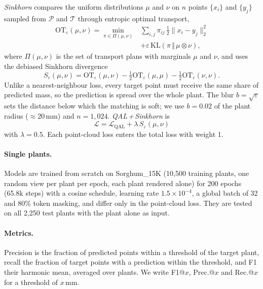 \documentclass[10pt,twocolumn,letterpaper]{article}
\begin{document}
\emph{Sinkhorn} compares the uniform distributions $\mu$ and $\nu$ on $n$ points $\{x_i\}$ and $\{y_j\}$ sampled from
$\mathcal{P}$ and $\mathcal{T}$ through entropic optimal transport,
\begin{equation}
  \begin{aligned}
    \mathrm{OT}_\varepsilon(\mu,\nu) = \min_{\pi\in\Pi(\mu,\nu)} &\sum_{i,j}\pi_{ij}\,\tfrac12\lVert x_i-y_j\rVert_2^2\\
      &+ \varepsilon\,\mathrm{KL}(\pi\,\Vert\,\mu\otimes\nu),
  \end{aligned}
  \label{eq:ot}
\end{equation}
where $\Pi(\mu,\nu)$ is the set of transport plans with marginals $\mu$ and $\nu$, and uses the debiased Sinkhorn
divergence
\begin{equation}
  S_\varepsilon(\mu,\nu) = \mathrm{OT}_\varepsilon(\mu,\nu) - \tfrac12\mathrm{OT}_\varepsilon(\mu,\mu)
    - \tfrac12\mathrm{OT}_\varepsilon(\nu,\nu).
  \label{eq:sink}
\end{equation}
Unlike a nearest-neighbour loss, every target point must receive the same share of predicted mass, so the
prediction is spread over the whole plant. The blur $b=\sqrt{\varepsilon}$ sets the distance below which the
matching is soft; we use $b=0.02$ of the plant radius ($\approx$20\,mm) and $n=1{,}024$. \emph{QAL\,+\,Sinkhorn} is
\begin{equation}
  \mathcal{L} = \mathcal{L}_{\mathrm{QAL}} + \lambda\,S_\varepsilon(\mu,\nu)
  \label{eq:qalsink}
\end{equation}
with $\lambda=0.5$. Each point-cloud loss enters the total loss with weight 1.

\paragraph{Single plants.}
Models are trained from scratch on Sorghum\_15K (10{,}500 training plants, one random view per plant per epoch,
each plant rendered alone) for 200 epochs (65.8k steps) with a cosine schedule, learning rate
$1.5\times10^{-4}$, a global batch of 32 and 80\% token masking, and differ only in the point-cloud loss. They
are tested on all 2{,}250 test plants with the plant alone as input.

\paragraph{Metrics.}
Precision is the fraction of predicted points within a threshold of the target plant, recall the fraction of
target points with a prediction within the threshold, and F1 their harmonic mean, averaged over plants. We write
F1@$x$, Prec.@$x$ and Rec.@$x$ for a threshold of $x$\,mm.
\end{document}
